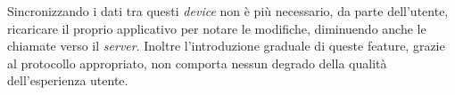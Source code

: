 Sincronizzando i dati tra questi \textit{device} non è più necessario, da parte dell'utente, ricaricare il proprio applicativo per notare le modifiche, diminuendo anche le chiamate verso il \textit{server}.
Inoltre l'introduzione graduale di queste feature, grazie al protocollo appropriato, non comporta nessun degrado della qualità dell'esperienza utente.
